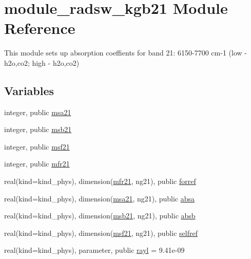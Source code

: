 \hypertarget{namespacemodule__radsw__kgb21}{}\section{module\+\_\+radsw\+\_\+kgb21 Module Reference}
\label{namespacemodule__radsw__kgb21}


This module sets up absorption coeffients for band 21\+: 6150-\/7700 cm-\/1 (low -\/ h2o,co2; high -\/ h2o,co2)  


\subsection*{Variables}
\begin{DoxyCompactItemize}
\item 
integer, public \hyperlink{namespacemodule__radsw__kgb21_a235b17e9b4b37668028c572f80e1188a}{msa21}
\item 
integer, public \hyperlink{namespacemodule__radsw__kgb21_a59710ca5b31c30385ea968c0f01e2e81}{msb21}
\item 
integer, public \hyperlink{namespacemodule__radsw__kgb21_ae70b5abfa847419cbf189d2502c34ddd}{msf21}
\item 
integer, public \hyperlink{namespacemodule__radsw__kgb21_a5575239aa9d55abcca1ac1f82dc4c4ec}{mfr21}
\item 
real(kind=kind\+\_\+phys), dimension(\hyperlink{namespacemodule__radsw__kgb21_a5575239aa9d55abcca1ac1f82dc4c4ec}{mfr21}, ng21), public \hyperlink{namespacemodule__radsw__kgb21_ac93d473e0309275f03a89b161377a034}{forref}
\item 
real(kind=kind\+\_\+phys), dimension(\hyperlink{namespacemodule__radsw__kgb21_a235b17e9b4b37668028c572f80e1188a}{msa21}, ng21), public \hyperlink{namespacemodule__radsw__kgb21_a7cce83c282d3efec6a3fe319480c270a}{absa}
\item 
real(kind=kind\+\_\+phys), dimension(\hyperlink{namespacemodule__radsw__kgb21_a59710ca5b31c30385ea968c0f01e2e81}{msb21}, ng21), public \hyperlink{namespacemodule__radsw__kgb21_a1d3f12f050c90be49f109205c463b29b}{absb}
\item 
real(kind=kind\+\_\+phys), dimension(\hyperlink{namespacemodule__radsw__kgb21_ae70b5abfa847419cbf189d2502c34ddd}{msf21}, ng21), public \hyperlink{namespacemodule__radsw__kgb21_a76fc3e4566fcee982b99b10ea562ba93}{selfref}
\item 
real(kind=kind\+\_\+phys), parameter, public \hyperlink{namespacemodule__radsw__kgb21_a8df418599fb8aef5fc8f2935a913b361}{rayl} = 9.\+41e-\/09
\end{DoxyCompactItemize}


